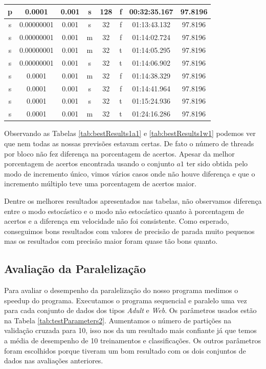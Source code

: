 \begin{table}
\begin{tabular}{|c|c|c|c|c|c|c|c|}
		p & 0.0001 & 0.001 & s & 128 & f & 00:32:35.167 & 97.8196\\ \hline
		s & 0.00000001 & 0.001 & s & 32 & f & 01:13:43.132 & 97.8196\\ \hline
		s & 0.00000001 & 0.001 & m & 32 & f & 01:14:02.724 & 97.8196\\ \hline
		s & 0.00000001 & 0.001 & m & 32 & t & 01:14:05.295 & 97.8196\\ \hline
		s & 0.00000001 & 0.001 & s & 32 & t & 01:14:06.902 & 97.8196\\ \hline
		s & 0.0001 & 0.001 & m & 32 & f & 01:14:38.329 & 97.8196\\ \hline
		s & 0.0001 & 0.001 & s & 32 & f & 01:14:41.964 & 97.8196\\ \hline
		s & 0.0001 & 0.001 & s & 32 & t & 01:15:24.936 & 97.8196\\ \hline
		s & 0.0001 & 0.001 & m & 32 & t & 01:24:16.286 & 97.8196\\ \hline
    \end{tabular}
\end{table}


Observando as Tabelas \ref{tab:bestResults1a1} e \ref{tab:bestResults1w1} podemos ver que nem todas as nossas previsões estavam certas. De fato o número de threads por bloco não fez diferença na porcentagem de acertos. Apesar da melhor porcentagem de acertos encontrada usando o conjunto $a1$ ter sido obtida pelo modo de incremento único, vimos vários casos onde não houve diferença e que o incremento múltiplo teve uma porcentagem de acertos maior.

Dentre os melhores resultados apresentados nas tabelas, não observamos diferença entre o modo estocástico e o modo não estocástico quanto à porcentagem de acertos e a diferença em velocidade não foi consistente. Como esperado, conseguimos bons resultados com valores de precisão de parada muito pequenos mas os resultados com precisão maior foram quase tão bons quanto.

\subsection{Avaliação da Paralelização}
Para avaliar o desempenho da paralelização do nosso programa medimos o speedup do programa. Executamos o programa sequencial e paralelo uma vez para cada conjunto de dados dos tipos \emph{Adult} e \emph{Web}. Os parâmetros usados estão na Tabela \ref{tab:testParameters2}.  %
Aumentamos o número de partições na validação cruzada para 10, isso nos da um resultado mais confiante já que temos a média de desempenho de 10 treinamentos e classificações. Os outros parâmetros foram escolhidos porque tiveram um bom resultado com os dois conjuntos de dados nas avaliações anteriores.

